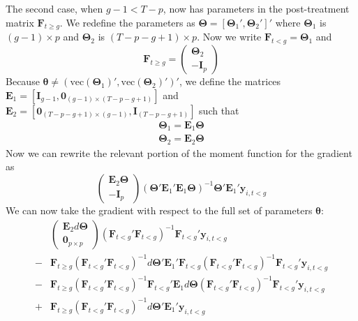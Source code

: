 \documentclass[12pt]{article}
\begin{document}
The second case, when $g - 1 < T-p$, now has parameters in the post-treatment matrix $\bm F_{t \geq g}$. We redefine the parameters as $\bm \Theta = [ \bm \Theta_1', \bm \Theta_2']'$ where $\bm \Theta_1$ is $(g-1) \times p$ and $\bm \Theta_2$ is $(T-p - g + 1) \times p$. Now we write $\bm F_{t < g} = \bm \Theta_1$ and 
\begin{equation}
    \bm F_{t \geq g} = 
    \begin{pmatrix}
        \bm \Theta_2\\
        - \bm I_p
    \end{pmatrix}
\end{equation}
Because $\bm \theta \neq (\text{vec}(\bm \Theta_1)', \text{vec}(\bm \Theta_2)')'$, we define the matrices $\bm E_1 = [\bm I_{g-1}, \bm 0_{(g-1) \times (T-p - g+1)}]$ and $\bm E_2 = [ \bm 0_{(T-p - g + 1) \times (g-1)}, \bm I_{(T-p -g + 1)}]$ such that 
\begin{gather}
    \bm \Theta_1 = \bm E_1 \bm \Theta\\
    \bm \Theta_2 = \bm E_2 \bm \Theta
\end{gather}
Now we can rewrite the relevant portion of the moment function for the gradient as
\begin{equation}
    \begin{pmatrix}
        \bm E_2 \bm \Theta\\
        -\bm I_p
    \end{pmatrix}
    \left( \bm \Theta' \bm E_1' \bm E_1 \bm \Theta \right)^{-1} \bm \Theta' \bm E_1' \bm y_{i, t < g}
\end{equation} 
We can now take the gradient with respect to the full set of parameters $\bm \theta$:
\begin{align}
    & 
    \begin{pmatrix}
        \bm E_2 d \bm \Theta\\
        \bm 0_{p \times p}
    \end{pmatrix}
    \left( \bm F_{t < g}' \bm F_{t < g} \right)^{-1} \bm F_{t < g}' \bm y_{i, t < g}\label{case2_diff_eq1}\\
    - & 
    \bm F_{t \geq g} \left( \bm F_{t < g}' \bm F_{t < g} \right)^{-1} d \bm \Theta' \bm E_1' \bm F_{t < g} \left( \bm F_{t < g}' \bm F_{t < g} \right)^{-1} \bm F_{t < g}' \bm y_{i, t < g}\\
    - & \bm F_{t \geq g} \left( \bm F_{t < g}' \bm F_{t < g} \right)^{-1} \bm F_{t < g}' \bm E_1 d \bm \Theta \left( \bm F_{t < g}' \bm F_{t < g} \right)^{-1} \bm F_{t < g}' \bm y_{i, t < g}\\
    + & 
    \bm F_{t \geq g} \left( \bm F_{t < g}' \bm F_{t < g} \right)^{-1} d \bm \Theta' \bm E_1' \bm y_{i, t < g}
\end{align}
\end{document}

